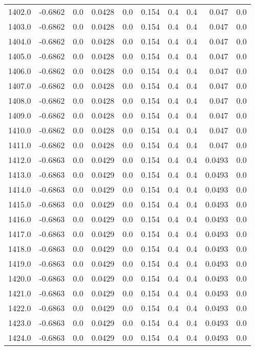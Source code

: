\begin{longtable}{lrrrrrrrrr}
1402.0 & -0.6862 & 0.0 & 0.0428 & 0.0 & 0.154 & 0.4 & 0.4 & 0.047 & 0.0 \\
1403.0 & -0.6862 & 0.0 & 0.0428 & 0.0 & 0.154 & 0.4 & 0.4 & 0.047 & 0.0 \\
1404.0 & -0.6862 & 0.0 & 0.0428 & 0.0 & 0.154 & 0.4 & 0.4 & 0.047 & 0.0 \\
1405.0 & -0.6862 & 0.0 & 0.0428 & 0.0 & 0.154 & 0.4 & 0.4 & 0.047 & 0.0 \\
1406.0 & -0.6862 & 0.0 & 0.0428 & 0.0 & 0.154 & 0.4 & 0.4 & 0.047 & 0.0 \\
1407.0 & -0.6862 & 0.0 & 0.0428 & 0.0 & 0.154 & 0.4 & 0.4 & 0.047 & 0.0 \\
1408.0 & -0.6862 & 0.0 & 0.0428 & 0.0 & 0.154 & 0.4 & 0.4 & 0.047 & 0.0 \\
1409.0 & -0.6862 & 0.0 & 0.0428 & 0.0 & 0.154 & 0.4 & 0.4 & 0.047 & 0.0 \\
1410.0 & -0.6862 & 0.0 & 0.0428 & 0.0 & 0.154 & 0.4 & 0.4 & 0.047 & 0.0 \\
1411.0 & -0.6862 & 0.0 & 0.0428 & 0.0 & 0.154 & 0.4 & 0.4 & 0.047 & 0.0 \\
1412.0 & -0.6863 & 0.0 & 0.0429 & 0.0 & 0.154 & 0.4 & 0.4 & 0.0493 & 0.0 \\
1413.0 & -0.6863 & 0.0 & 0.0429 & 0.0 & 0.154 & 0.4 & 0.4 & 0.0493 & 0.0 \\
1414.0 & -0.6863 & 0.0 & 0.0429 & 0.0 & 0.154 & 0.4 & 0.4 & 0.0493 & 0.0 \\
1415.0 & -0.6863 & 0.0 & 0.0429 & 0.0 & 0.154 & 0.4 & 0.4 & 0.0493 & 0.0 \\
1416.0 & -0.6863 & 0.0 & 0.0429 & 0.0 & 0.154 & 0.4 & 0.4 & 0.0493 & 0.0 \\
1417.0 & -0.6863 & 0.0 & 0.0429 & 0.0 & 0.154 & 0.4 & 0.4 & 0.0493 & 0.0 \\
1418.0 & -0.6863 & 0.0 & 0.0429 & 0.0 & 0.154 & 0.4 & 0.4 & 0.0493 & 0.0 \\
1419.0 & -0.6863 & 0.0 & 0.0429 & 0.0 & 0.154 & 0.4 & 0.4 & 0.0493 & 0.0 \\
1420.0 & -0.6863 & 0.0 & 0.0429 & 0.0 & 0.154 & 0.4 & 0.4 & 0.0493 & 0.0 \\
1421.0 & -0.6863 & 0.0 & 0.0429 & 0.0 & 0.154 & 0.4 & 0.4 & 0.0493 & 0.0 \\
1422.0 & -0.6863 & 0.0 & 0.0429 & 0.0 & 0.154 & 0.4 & 0.4 & 0.0493 & 0.0 \\
1423.0 & -0.6863 & 0.0 & 0.0429 & 0.0 & 0.154 & 0.4 & 0.4 & 0.0493 & 0.0 \\
1424.0 & -0.6863 & 0.0 & 0.0429 & 0.0 & 0.154 & 0.4 & 0.4 & 0.0493 & 0.0 \\

\end{longtable}
